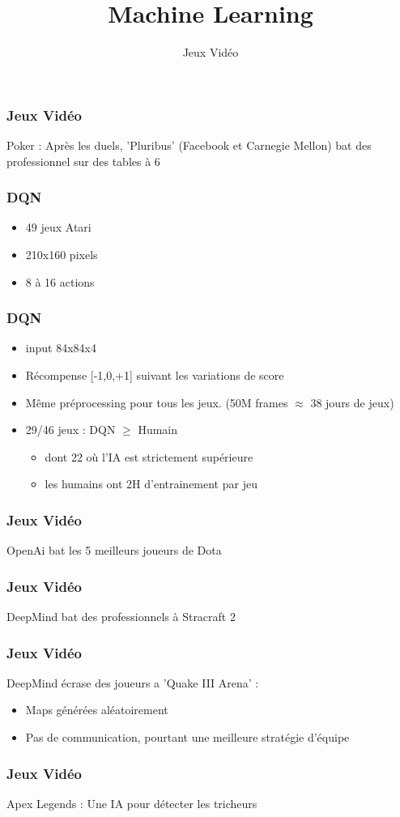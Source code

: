 \documentclass{formation}
\title{Machine Learning}
\subtitle{Jeux Vidéo}
\begin{document}
\maketitle

\begin{frame}
  \frametitle{Jeux Vidéo}
  Poker : Après les duels, 'Pluribus' (Facebook et Carnegie Mellon) bat des professionnel sur des tables à 6
\end{frame}

\begin{frame}
  \frametitle{DQN}
  \begin{itemize}
  \item 49 jeux Atari
  \item 210x160 pixels
  \item 8 à 16 actions
  \end{itemize}
\end{frame}

\begin{frame}
  \frametitle{DQN}
  \begin{itemize}
  \item input 84x84x4
  \item Récompense [-1,0,+1] suivant les variations de score
  \item Même préprocessing pour tous les jeux. (50M frames $\approx$ 38 jours de jeux)
  \item 29/46 jeux : DQN $\geq$ Humain
    \begin{itemize}
    \item dont 22 où l'IA est strictement supérieure
    \item les humains ont 2H d'entrainement par jeu
    \end{itemize}
  \end{itemize}
\end{frame}

\begin{frame}
  \frametitle{Jeux Vidéo}
  OpenAi bat les 5 meilleurs joueurs de Dota
\end{frame}

\begin{frame}
  \frametitle{Jeux Vidéo}
  DeepMind bat des professionnels à Stracraft 2
\end{frame}

\begin{frame}
  \frametitle{Jeux Vidéo}
  DeepMind écrase des joueurs a 'Quake III Arena' :
  \begin{itemize}
  \item Maps générées aléatoirement
  \item Pas de communication, pourtant une meilleure stratégie d'équipe
  \end{itemize}
\end{frame}

\begin{frame}
  \frametitle{Jeux Vidéo}
  Apex Legends : Une IA pour détecter les tricheurs
\end{frame}
\end{document}
